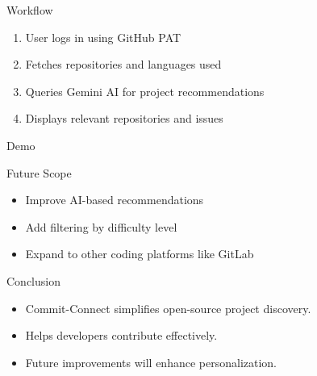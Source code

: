 \documentclass{beamer}
\begin{document}
\begin{frame}{Workflow}
    \begin{enumerate}
        \item User logs in using GitHub PAT
        \item Fetches repositories and languages used
        \item Queries Gemini AI for project recommendations
        \item Displays relevant repositories and issues
    \end{enumerate}
\end{frame}

\begin{frame}{Demo}
    
\end{frame}

\begin{frame}{Future Scope}
    \begin{itemize}
        \item Improve AI-based recommendations
        \item Add filtering by difficulty level
        \item Expand to other coding platforms like GitLab
    \end{itemize}
\end{frame}

\begin{frame}{Conclusion}
    \begin{itemize}
        \item Commit-Connect simplifies open-source project discovery.
        \item Helps developers contribute effectively.
        \item Future improvements will enhance personalization.
    \end{itemize}
\end{frame}
\end{document}
